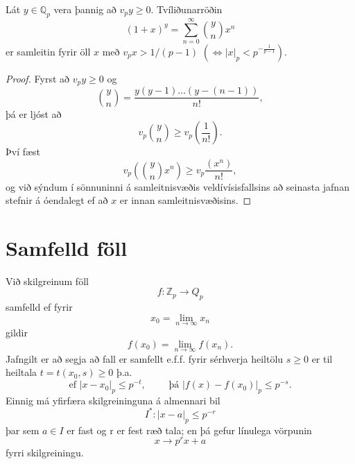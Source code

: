 \begin{setn}
Lát $y\in \mathbb{Q}_p$ vera þannig að $v_p y \geq 0$. Tvíliðunarröðin 
\begin{equation*}
(1+x)^y = \sum_{n=0}^\infty \binom{y}{n}x^n
\end{equation*}
er samleitin fyrir öll $x$ með $v_px>1/(p-1)$  $( \iff |x|_p <p^{-\frac{1}{p-1}})$.
\end{setn}
\begin{proof}
Fyrst að $v_py\geq0$ og 
\begin{equation*}
\binom{y}{n} = \frac{y(y-1)\ldots (y-(n-1))}{n!},
\end{equation*}
þá er ljóst að
\begin{equation*}
v_p \binom{y}{n} \geq v_p \left( \frac{1}{n!} \right).
\end{equation*}
Því fæst
\begin{equation*}
v_p \left( \binom{y}{n} x^n \right) \geq v_p \frac{(x^n) }{n!},
\end{equation*}
og við sýndum í sönnuninni á samleitnisvæðis veldívísisfallsins að seinasta jafnan stefnir á óendalegt ef að $x$ er innan samleitnisvæðisins.
\end{proof}


\section*{Samfelld föll}

\begin{skilgr}
Við skilgreinum föll
\begin{equation*}
f:\mathbb{Z}_p \rightarrow Q_p
\end{equation*}
samfelld ef fyrir 
\begin{equation*}
x_0 = \lim_{n \rightarrow \infty} x_n
\end{equation*}
gildir
\begin{equation*}
f(x_0) = \lim_{n \rightarrow \infty} f(x_n).
\end{equation*}
Jafngilt er að segja að fall er samfellt e.f.f. fyrir sérhverja heiltölu $s\geq 0$ er til heiltala $t = t(x_0,s)\geq 0$ þ.a.
\begin{equation*}
\mbox{ef } |x-x_0|_p \leq p^{-t},\qquad \mbox{  þá } |f(x)-f(x_0)|_p \leq p^{-s}.
\end{equation*}
Einnig má yfirfæra skilgreininguna á almennari bil
\begin{equation*}
I^* : |x-a|_p \leq p^{-r}
\end{equation*} 
þar sem $a \in I$ er fast og r er fest ræð tala; en þá gefur línulega vörpunin 
\begin{equation*}
x \rightarrow p^rx+a
\end{equation*}
fyrri skilgreiningu.
\end{skilgr}

